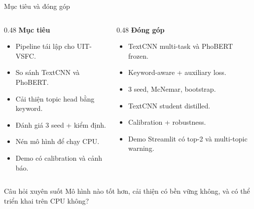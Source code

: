 \documentclass[aspectratio=169,11pt]{beamer}
\begin{document}
\begin{frame}{Mục tiêu và đóng góp}
\begin{columns}[T]
\begin{column}{0.48\textwidth}
\textbf{Mục tiêu}
\begin{itemize}
  \item Pipeline tái lập cho UIT-VSFC.
  \item So sánh TextCNN và PhoBERT.
  \item Cải thiện topic head bằng keyword.
  \item Đánh giá 3 seed + kiểm định.
  \item Nén mô hình để chạy CPU.
  \item Demo có calibration và cảnh báo.
\end{itemize}
\end{column}
\begin{column}{0.48\textwidth}
\textbf{Đóng góp}
\begin{itemize}
  \item TextCNN multi-task và PhoBERT frozen.
  \item Keyword-aware + auxiliary loss.
  \item 3 seed, McNemar, bootstrap.
  \item TextCNN student distilled.
  \item Calibration + robustness.
  \item Demo Streamlit có top-2 và multi-topic warning.
\end{itemize}
\end{column}
\end{columns}

\vspace{0.25cm}
\begin{block}{Câu hỏi xuyên suốt}
Mô hình nào tốt hơn, cải thiện có bền vững không, và có thể triển khai trên CPU không?
\end{block}
\end{frame}
\end{document}
